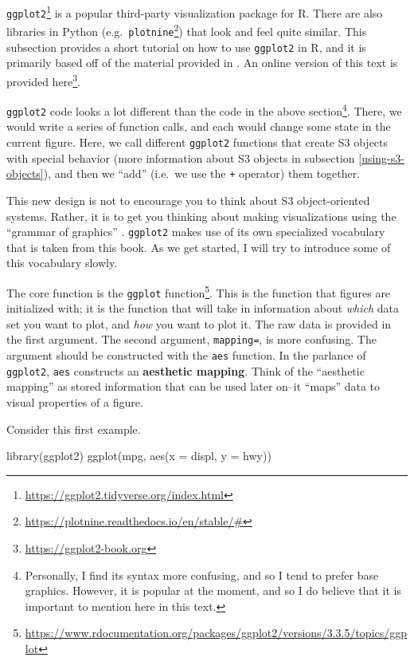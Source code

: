 \documentclass[
  12pt,
]{krantz}
\makeatletter
\newenvironment{Shaded}{\begin{snugshade}}{\end{snugshade}}
\newcommand{\AttributeTok}[1]{\textcolor[rgb]{0.61,0.61,0.61}{#1}}
\newcommand{\FunctionTok}[1]{\textcolor[rgb]{0,0,0}{#1}}
\newcommand{\NormalTok}[1]{#1}
\renewcommand{\href}[2]{#2\footnote{\url{#1}}}
\newenvironment{kframe}{%
\medskip{}
\setlength{\fboxsep}{.8em}
 \def\at@end@of@kframe{}%
 \ifinner\ifhmode%
  \def\at@end@of@kframe{\end{minipage}}%
  \begin{minipage}{\columnwidth}%
 \fi\fi%
 \def\FrameCommand##1{\hskip\@totalleftmargin \hskip-\fboxsep
 \colorbox{shadecolor}{##1}\hskip-\fboxsep
     \hskip-\linewidth \hskip-\@totalleftmargin \hskip\columnwidth}%
 \MakeFramed {\advance\hsize-\width
   \@totalleftmargin\z@ \linewidth\hsize
   \@setminipage}}%
 {\par\unskip\endMakeFramed%
 \at@end@of@kframe}
\renewenvironment{Shaded}{\begin{kframe}}{\end{kframe}}
\makeatother
\begin{document}
\href{https://ggplot2.tidyverse.org/index.html}{\texttt{ggplot2}} is a popular third-party visualization package for R. There are also libraries in Python (e.g.~\href{https://plotnine.readthedocs.io/en/stable/\#}{\texttt{plotnine}}) that look and feel quite similar. This subsection provides a short tutorial on how to use \texttt{ggplot2} in R, and it is primarily based off of the material provided in \citep{ggplot2}. An online version of this text is provided \href{https://ggplot2-book.org}{here}.

\texttt{ggplot2} code looks a lot different than the code in the above section\footnote{Personally, I find its syntax more confusing, and so I tend to prefer base graphics. However, it is popular at the moment, and so I do believe that it is important to mention here in this text.}. There, we would write a series of function calls, and each would change some state in the current figure. Here, we call different \texttt{ggplot2} functions that create S3 objects with special behavior (more information about S3 objects in subsection \ref{using-s3-objects}), and then we ``add'' (i.e.~we use the \texttt{+} operator) them together.

This new design is not to encourage you to think about S3 object-oriented systems. Rather, it is to get you thinking about making visualizations using the ``grammar of graphics'' \citep{gog}. \texttt{ggplot2} makes use of its own specialized vocabulary that is taken from this book. As we get started, I will try to introduce some of this vocabulary slowly.

The core function is the \href{https://www.rdocumentation.org/packages/ggplot2/versions/3.3.5/topics/ggplot}{\texttt{ggplot} function}. This is the function that figures are initialized with; it is the function that will take in information about \emph{which} data set you want to plot, and \emph{how} you want to plot it. The raw data is provided in the first argument. The second argument, \texttt{mapping=}, is more confusing. The argument should be constructed with the \texttt{aes} function. In the parlance of \texttt{ggplot2}, \texttt{aes} constructs an \textbf{aesthetic mapping}. Think of the ``aesthetic mapping'' as stored information that can be used later on--it ``maps'' data to visual properties of a figure.

Consider this first example.

\begin{Shaded}
\begin{Highlighting}[]
\FunctionTok{library}\NormalTok{(ggplot2)}
\FunctionTok{ggplot}\NormalTok{(mpg, }\FunctionTok{aes}\NormalTok{(}\AttributeTok{x =}\NormalTok{ displ, }\AttributeTok{y =}\NormalTok{ hwy))}
\end{Highlighting}
\end{Shaded}
\end{document}
